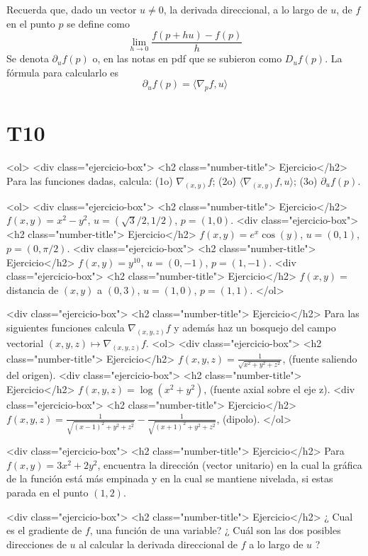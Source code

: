 \documentclass{article}
\theoremstyle{definition}
\begin{document}
Recuerda que, dado un vector $u\ne 0$, la derivada direccional, a lo largo de $u$, de $f$
en el punto $p$ se define como
$$
\lim_{h \to 0} \frac{f(p+hu)-f(p)}{h}
$$
Se denota $\partial_uf(p)$ o, en las notas en pdf que
se subieron como  $D_uf(p)$. La fórmula para calcularlo es
$$
\partial_uf(p)= \langle \nabla_pf, u \rangle 
$$

\section*{T10 }

<ol>
<div class="ejercicio-box"> <h2 class="number-title"> Ejercicio</h2> Para las funciones dadas, calcula: (1o) $\nabla_{(x,y)}f$;
  (2o) $\langle \nabla_{(x,y)} f, u \rangle$;
  (3o) $\partial_{u}f(p)$.

  <ol>
  <div class="ejercicio-box"> <h2 class="number-title"> Ejercicio</h2> $f(x,y)=x^2-y^2$, $u=(\sqrt{3}/2,1/2)$, $p=(1,0)$.
  <div class="ejercicio-box"> <h2 class="number-title"> Ejercicio</h2> $f(x,y)=e^x\cos(y)$, $u=(0,1)$, $p=(0,\pi/2)$.
  <div class="ejercicio-box"> <h2 class="number-title"> Ejercicio</h2> $f(x,y)=y^{10}$, $u=(0,-1)$, $p=(1,-1)$.
    <div class="ejercicio-box"> <h2 class="number-title"> Ejercicio</h2> $f(x,y)=$ distancia de $(x,y)$ a $(0,3)$, $u=(1,0)$, $p=(1,1)$.
  </ol>

<div class="ejercicio-box"> <h2 class="number-title"> Ejercicio</h2> Para las siguientes funciones calcula $\nabla_{(x,y,z)}f$ y además haz un bosquejo
  del campo vectorial $(x,y,z)\mapsto \nabla_{(x,y,z)}f$.
  <ol>
  <div class="ejercicio-box"> <h2 class="number-title"> Ejercicio</h2> $f(x,y,z)=\frac{1}{\sqrt{x^2+y^2+z^2}}$, (fuente saliendo del origen).
  <div class="ejercicio-box"> <h2 class="number-title"> Ejercicio</h2> $f(x,y,z)=\log(x^2+y^2)$, (fuente axial sobre el eje z).
  <div class="ejercicio-box"> <h2 class="number-title"> Ejercicio</h2> $f(x,y,z)=\frac{1}{\sqrt{(x-1)^2+y^2+z^2}}-\frac{1}{\sqrt{(x+1)^2+y^2+z^2}}$, (dipolo). 
  </ol>

<div class="ejercicio-box"> <h2 class="number-title"> Ejercicio</h2> Para $f(x,y)=3x^2+2y^2$, encuentra la dirección (vector unitario) en la cual la gráfica
  de la función está más empinada  y en la cual se mantiene nivelada, si estas parada
  en el punto $(1,2)$.
  
<div class="ejercicio-box"> <h2 class="number-title"> Ejercicio</h2> ¿ Cual es el gradiente de $f$,
  una función de una variable?
  ¿ Cuál son las dos posibles direcciones de $u$ al calcular
  la derivada direccional de $f$ a lo largo de $u$ ?
\end{document}
